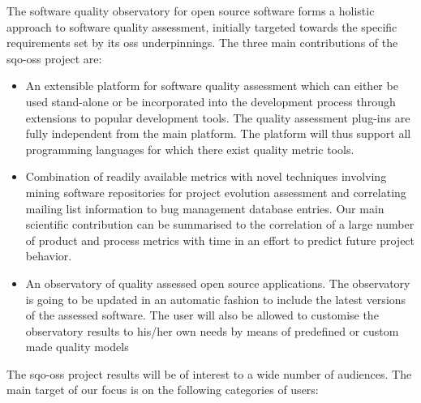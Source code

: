 \documentclass{llncs}
\begin{document}
The software quality observatory for open source software forms a holistic approach to software quality assessment, 
initially targeted towards the specific requirements set by its {\sc oss} 
underpinnings. The three main contributions of the {\sc sqo-oss} project are:
\begin{itemize}
	\item An extensible platform for software quality assessment 
	which can either be used stand-alone or be incorporated into the development 
	process through extensions to popular development tools. The quality 
	assessment plug-ins are fully independent from the main platform. The 
	platform will thus support all programming languages for which there exist 
	quality metric tools.
	\item Combination of readily available metrics with novel techniques 
	involving mining software repositories for project evolution assessment and 
	correlating mailing list information to bug management database entries. Our 
	main scientific contribution can be summarised to the correlation of a large 
	number of product and process metrics with time in an effort to predict 
	future project behavior.
	\item An observatory of quality assessed open source applications. The 
	observatory is going to be updated in an automatic fashion to include the 
	latest versions of the assessed software. The user will also be allowed to 
	customise the observatory results to his/her own needs by means of 
	predefined or custom made quality models	
\end{itemize}

The {\sc sqo-oss} project results will be of interest to a wide number of
audiences. The main target of our focus is on the following categories of users:
\end{document}
